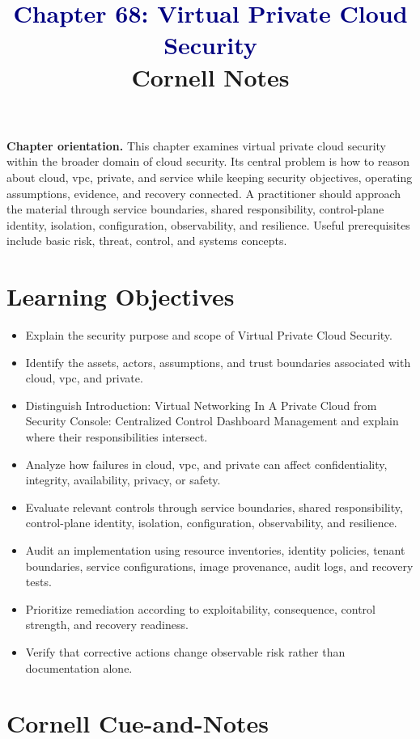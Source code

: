 \documentclass[11pt]{article}
\title{\textcolor{Navy}{Chapter 68: Virtual Private Cloud Security}\\[2mm]\large Cornell Notes}
\author{}
\date{}
\begin{document}
\maketitle
\thispagestyle{fancy}
\vspace{-1.5em}
\begin{orientationbox}
\textbf{Chapter orientation.} This chapter examines virtual private cloud security within the broader domain of cloud security. Its central problem is how to reason about cloud, vpc, private, and service while keeping security objectives, operating assumptions, evidence, and recovery connected. A practitioner should approach the material through service boundaries, shared responsibility, control-plane identity, isolation, configuration, observability, and resilience. Useful prerequisites include basic risk, threat, control, and systems concepts.
\end{orientationbox}
\section*{Learning Objectives}
\begin{itemize}
\item Explain the security purpose and scope of Virtual Private Cloud Security.
\item Identify the assets, actors, assumptions, and trust boundaries associated with cloud, vpc, and private.
\item Distinguish Introduction: Virtual Networking In A Private Cloud from Security Console: Centralized Control Dashboard Management and explain where their responsibilities intersect.
\item Analyze how failures in cloud, vpc, and private can affect confidentiality, integrity, availability, privacy, or safety.
\item Evaluate relevant controls through service boundaries, shared responsibility, control-plane identity, isolation, configuration, observability, and resilience.
\item Audit an implementation using resource inventories, identity policies, tenant boundaries, service configurations, image provenance, audit logs, and recovery tests.
\item Prioritize remediation according to exploitability, consequence, control strength, and recovery readiness.
\item Verify that corrective actions change observable risk rather than documentation alone.
\end{itemize}
\section*{Cornell Cue-and-Notes}
\end{document}

